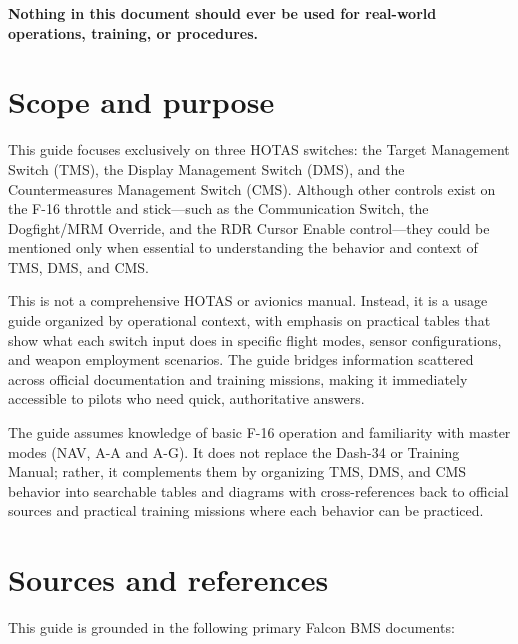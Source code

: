 \documentclass[11pt, a4paper, twoside]{report}
\begin{document}
\textbf{Nothing in this document should ever be used for real-world operations, training, or procedures.}

\section{Scope and purpose}
\label{sec:C1-S1}

This guide focuses exclusively on three HOTAS switches: the Target Management Switch (TMS), the Display Management Switch (DMS), and the Countermeasures Management Switch (CMS). Although other controls exist on the F-16 throttle and stick---such as the Communication Switch, the Dogfight/MRM Override, and the RDR Cursor Enable control---they could be mentioned only when essential to understanding the behavior and context of TMS, DMS, and CMS.

This is not a comprehensive HOTAS or avionics manual. Instead, it is a usage guide organized by operational context, with emphasis on practical tables that show what each switch input does in specific flight modes, sensor configurations, and weapon employment scenarios. The guide bridges information scattered across official documentation and training missions, making it immediately accessible to pilots who need quick, authoritative answers.

The guide assumes knowledge of basic F-16 operation and familiarity with master modes (NAV, A-A and A-G). It does not replace the Dash-34 or Training Manual; rather, it complements them by organizing TMS, DMS, and CMS behavior into searchable tables and diagrams with cross-references back to official sources and practical training missions where each behavior can be practiced.

\section{Sources and references}
\label{sec:C1-S2}

This guide is grounded in the following primary Falcon BMS documents:
\end{document}
